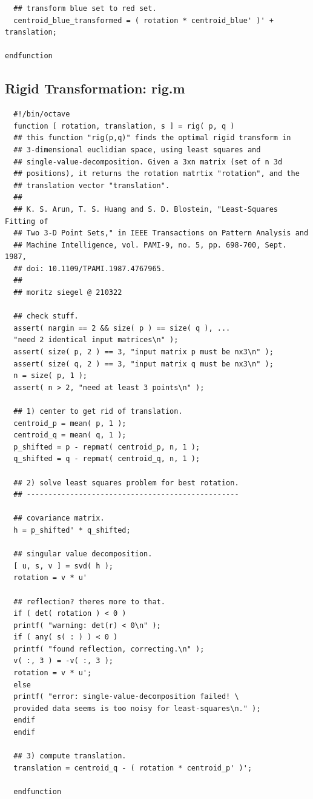 \documentclass[11pt, a4paper, oneside, twocolumn]{report}
\newcommand{\n}{\textnormal}
\begin{document}
\begin{verbatim}
  ## transform blue set to red set.
  centroid_blue_transformed = ( rotation * centroid_blue' )' + translation;

endfunction
\end{verbatim}


\subsection{Rigid Transformation: rig.m}\label{s:c:rig}

\begin{verbatim}
  #!/bin/octave
  function [ rotation, translation, s ] = rig( p, q )
  ## this function "rig(p,q)" finds the optimal rigid transform in
  ## 3-dimensional euclidian space, using least squares and
  ## single-value-decomposition. Given a 3xn matrix (set of n 3d
  ## positions), it returns the rotation matrtix "rotation", and the
  ## translation vector "translation".
  ##
  ## K. S. Arun, T. S. Huang and S. D. Blostein, "Least-Squares Fitting of
  ## Two 3-D Point Sets," in IEEE Transactions on Pattern Analysis and
  ## Machine Intelligence, vol. PAMI-9, no. 5, pp. 698-700, Sept. 1987,
  ## doi: 10.1109/TPAMI.1987.4767965.
  ##
  ## moritz siegel @ 210322

  ## check stuff.
  assert( nargin == 2 && size( p ) == size( q ), ...
  "need 2 identical input matrices\n" );
  assert( size( p, 2 ) == 3, "input matrix p must be nx3\n" );
  assert( size( q, 2 ) == 3, "input matrix q must be nx3\n" );
  n = size( p, 1 );
  assert( n > 2, "need at least 3 points\n" );

  ## 1) center to get rid of translation.
  centroid_p = mean( p, 1 );
  centroid_q = mean( q, 1 );
  p_shifted = p - repmat( centroid_p, n, 1 );
  q_shifted = q - repmat( centroid_q, n, 1 );

  ## 2) solve least squares problem for best rotation.
  ## -------------------------------------------------
  
  ## covariance matrix.
  h = p_shifted' * q_shifted;
  
  ## singular value decomposition.
  [ u, s, v ] = svd( h );
  rotation = v * u'

  ## reflection? theres more to that.
  if ( det( rotation ) < 0 )
  printf( "warning: det(r) < 0\n" );
  if ( any( s( : ) ) < 0 )
  printf( "found reflection, correcting.\n" );
  v( :, 3 ) = -v( :, 3 );
  rotation = v * u';
  else
  printf( "error: single-value-decomposition failed! \
  provided data seems is too noisy for least-squares\n." );  
  endif
  endif

  ## 3) compute translation.
  translation = centroid_q - ( rotation * centroid_p' )';
  
  endfunction
\end{verbatim}
\end{document}
